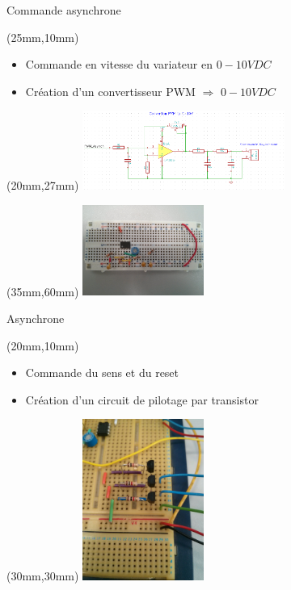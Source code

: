 \documentclass[10pt]{beamer}
\begin{document}
	\begin{frame}{Commande asynchrone}
		
		\begin{textblock*}{80mm}(25mm,10mm)
			\begin{itemize}
				\item Commande en vitesse du variateur en $0-10VDC$
				\item Création d'un convertisseur PWM $\Rightarrow$ $0-10VDC$
 			\end{itemize}
		\end{textblock*}

		\begin{textblock*}{80mm}(20mm,27mm)
				\includegraphics[width=250px]{schema_digt_anolog.png}
		\end{textblock*}

		\begin{textblock*}{80mm}(35mm,60mm)
				\includegraphics[width=150px]{IMG_20160629_203955.jpg}
		\end{textblock*}
		
	\end{frame}

	\begin{frame}{Asynchrone}
		
		\begin{textblock*}{80mm}(20mm,10mm)
			\begin{itemize}
				\item Commande du sens et du reset
				\item Création d'un circuit de pilotage par transistor
 			\end{itemize}
		\end{textblock*}

		\begin{textblock*}{80mm}(30mm,30mm)
				\includegraphics[width=150px]{IMG_20160630_163442.jpg}
		\end{textblock*}
		
	\end{frame}
\end{document}
